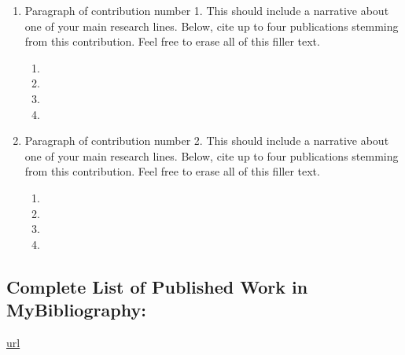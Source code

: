 \documentclass{nihbiosketch}
\begin{document}
\begin{enumerate}

\item Paragraph of contribution number 1. This should include a narrative about one of your main research lines. Below, cite up to four publications stemming from this contribution. Feel free to erase all of this filler text.

\begin{enumerate}
  \item {}
  \item {}
  \item {}
  \item {}
\end{enumerate}


\item Paragraph of contribution number 2. This should include a narrative about one of your main research lines. Below, cite up to four publications stemming from this contribution. Feel free to erase all of this filler text.

\begin{enumerate}
  \item {}
  \item {}
  \item {}
  \item {}
\end{enumerate}

\end{enumerate}



  \subsection*{Complete List of Published Work in MyBibliography:} 
  \url{url}
\end{document}
